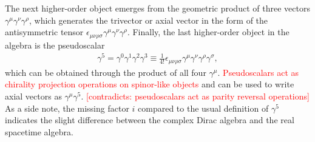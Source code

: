 \documentclass[submission, Phys]{SciPost}
\begin{document}
The next higher-order object emerges from the geometric product of three vectors $\gamma^\mu \gamma^\nu \gamma^\rho$, which generates the trivector or axial vector in the form of the antisymmetric tensor $\epsilon_{\mu\nu\rho\sigma}\gamma^{\mu}\gamma^{\nu}\gamma^{\rho}$. Finally, the last higher-order object in the algebra is the pseudoscalar
%
\begin{align}
    \gamma^5
    =\gamma^0\gamma^1\gamma^2\gamma^3 
    \equiv \frac{1}{4!}\epsilon_{\mu\nu\rho\sigma}\gamma^\mu\gamma^\nu\gamma^\rho\gamma^\sigma,
\end{align}
%
which can be obtained through the product of all four $\gamma^\mu$. \textcolor{red}{Pseudoscalars act as chirality projection operations on spinor-like objects} and can be used to write axial vectors as $\gamma^\mu\gamma^5$. \textcolor{red}{[contradicts: pseudoscalars act as parity reversal operations]} As a side note, the missing factor $i$ compared to the usual definition of $\gamma^5$ indicates the slight difference between the complex Dirac algebra and the real spacetime algebra.
\end{document}
